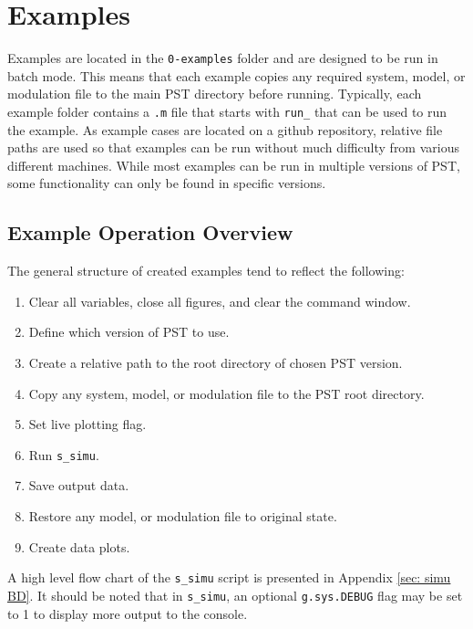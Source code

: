 \chapter{Examples}
Examples are located in the \verb|0-examples| folder and are designed to be run in batch mode.
This means that each example copies any required system, model, or modulation file to the main PST directory before running.
Typically, each example folder contains a \verb|.m| file that starts with \verb|run_| that can be used to run the example.
As example cases are located on a github repository, relative file paths are used so that examples can be run without much difficulty from various different machines.
While most examples can be run in multiple versions of PST, some functionality can only be found in specific versions.


\section{Example Operation Overview}

\noindent The general structure of created examples tend to reflect the following:
\begin{enumerate}
\itemsep 0em
\item Clear all variables, close all figures, and clear the command window.
\item Define which version of PST to use.
\item Create a relative path to the root directory of chosen PST version.
\item Copy any system, model, or modulation file to the PST root directory.
\item Set live plotting flag.
\item Run \verb|s_simu|.
\item Save output data.
\item Restore any model, or modulation file to original state.
\item Create data plots.
\end{enumerate}

A high level flow chart of the \verb|s_simu| script is presented in Appendix \ref{sec: simu BD}.
It should be noted that in \verb|s_simu|, an optional \verb|g.sys.DEBUG| flag may be set to 1 to display more output to the console.



